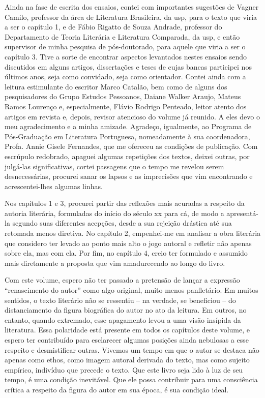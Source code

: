 Ainda na fase de escrita dos ensaios, contei com importantes sugestões de Vagner Camilo, professor da área de Literatura Brasileira, da usp, para o texto que viria a ser o capítulo 1, e de Fábio Rigatto de Souza Andrade, professor do Departamento de Teoria Literária e Literatura Comparada, da usp, e então supervisor de minha pesquisa de pós-doutorado, para aquele que viria a ser o capítulo 3. Tive a sorte de encontrar aspectos levantados nestes ensaios sendo discutidos em alguns artigos, dissertações e teses de cujas bancas participei nos últimos anos, seja como convidado, seja como orientador. Contei ainda com a leitura estimulante do escritor Marco Catalão, bem como de alguns dos pesquisadores do Grupo Estudos Pessoanos, Daiane Walker Araujo, Mateus Ramos Lourenço e, especialmente, Flávio Rodrigo Penteado, leitor atento dos artigos em revista e, depois, revisor atencioso do volume já reunido. A eles devo o meu agradecimento e a minha amizade. Agradeço, igualmente, ao Programa de Pós-Graduação em Literatura Portuguesa, nomeadamente à sua coordenadora, Profa. Annie Gisele Fernandes, que me ofereceu as condições de publicação. Com escrúpulo redobrado, apaguei algumas repetições dos textos, deixei outras, por julgá-las significativas, cortei passagens que o tempo me revelou serem desnecessárias, procurei sanar os lapsos e as imprecisões que vim encontrando e acrescentei-lhes algumas linhas. 

Nos capítulos 1 e 3, procurei partir das reflexões mais acuradas a respeito da autoria literária, formuladas do início do século xx para cá, de modo a apresentá-la segundo suas diferentes acepções, desde a sua rejeição drástica até sua retomada menos diretiva. No capítulo 2, empenhei-me em analisar a obra literária que considero ter levado ao ponto mais alto o jogo autoral e refletir não apenas sobre ela, mas com ela. Por fim, no capítulo 4, creio ter formulado e assumido mais diretamente a proposta que vim amadurecendo ao longo do livro. 

Com este volume, espero não ter passado a pretensão de lançar a expressão “renascimento do autor” como algo original, muito menos panfletário. Em muitos sentidos, o texto literário não se ressentiu – na verdade, se beneficiou – do distanciamento da figura biográfica do autor no ato da leitura. Em outros, no entanto, quando extremado, esse apagamento levou a uma visão insípida da literatura. Essa polaridade está presente em todos os capítulos deste volume, e espero ter contribuído para esclarecer algumas posições ainda nebulosas a esse respeito e desmistificar outras. Vivemos um tempo em que o autor se destaca não apenas como ethos, como imagem autoral derivada do texto, mas como sujeito empírico, indivíduo que precede o texto. Que este livro seja lido à luz de seu tempo, é uma condição inevitável. Que ele possa contribuir para uma consciência crítica a respeito da figura do autor em sua época, é sua condição ideal. 